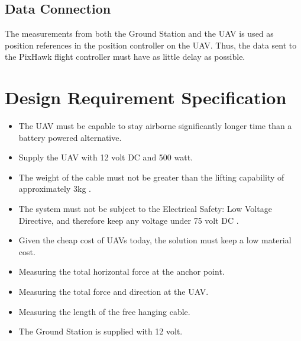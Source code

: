 \subsection{Data Connection}
The measurements from both the Ground Station and the UAV is used as position references in the position controller on the UAV. Thus, the data sent to the PixHawk flight controller must have as little delay as possible.

\newpage
\section{Design Requirement Specification}
\begin{itemize}
\item The UAV must be capable to stay airborne significantly longer time than a battery powered alternative.
\item Supply the UAV with 12 volt DC and 500 watt.
\item The weight of the cable must not be greater than the lifting capability of approximately 3kg \cite{Sidea2013}.
\item The system must not be subject to the Electrical Safety: Low Voltage Directive, and therefore keep any voltage under 75 volt DC \cite{Parliament2006}.
\item Given the cheap cost of UAVs today, the solution must keep a low material cost.
\item Measuring the total horizontal force at the anchor point.
\item Measuring the total force and direction at the UAV.
\item Measuring the length of the free hanging cable.
\item The Ground Station is supplied with 12 volt.
\end{itemize}





